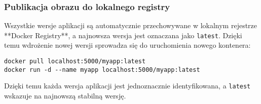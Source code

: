 \subsubsection{Publikacja obrazu do lokalnego registry}

Wszystkie wersje aplikacji są automatycznie przechowywane w lokalnym rejestrze **Docker Registry**, a najnowsza wersja jest oznaczana jako \texttt{latest}. Dzięki temu wdrożenie nowej wersji sprowadza się do uruchomienia nowego kontenera:

\begin{verbatim}
docker pull localhost:5000/myapp:latest
docker run -d --name myapp localhost:5000/myapp:latest
\end{verbatim}

Dzięki temu każda wersja aplikacji jest jednoznacznie identyfikowana, a \texttt{latest} wskazuje na najnowszą stabilną wersję.